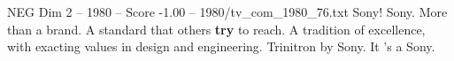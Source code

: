 \begin{textsample}{NEG Dim 2 – 1980 – Score -1.00 – 1980/tv\_com\_1980\_76.txt}  \label{ex:f2_neg_029}
Sony!
Sony.
More than a brand.
A standard that others \textbf{try} to reach.
A tradition of excellence, with exacting values in design and engineering.
Trinitron by Sony.
It 's a Sony.

\end{textsample}
